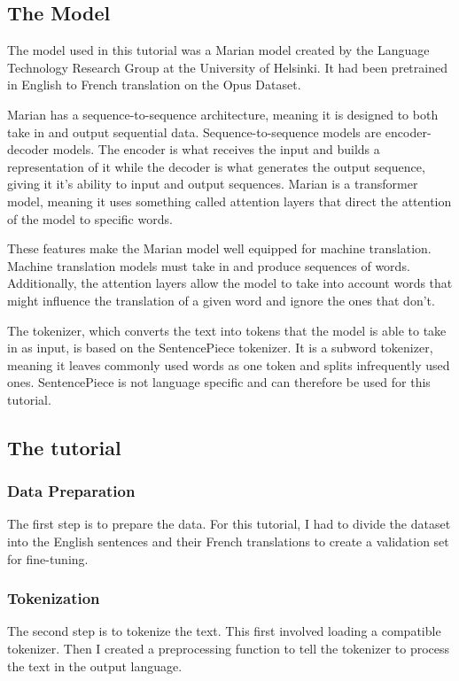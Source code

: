\documentclass[10pt,twocolumn]{article}
\begin{document}
\subsection{The Model}
The model used in this tutorial was a Marian model created by the Language Technology Research Group at the University of Helsinki. It had been pretrained in English to French translation on the Opus Dataset. 

Marian has a sequence-to-sequence architecture, meaning it is designed to both take in and output sequential data. Sequence-to-sequence models are encoder-decoder models. The encoder is what receives the input and builds a representation of it while the decoder is what generates the output sequence, giving it it's ability to input and output sequences. Marian is a transformer model, meaning it uses something called attention layers that direct the attention of the model to specific words. 

These features make the Marian model well equipped for machine translation. Machine translation models must take in and produce sequences of words. Additionally, the attention layers allow the model to take into account words that might influence the translation of a given word and ignore the ones that don't. 

The tokenizer, which converts the text into tokens that the model is able to take in as input, is based on the SentencePiece tokenizer. It is a subword tokenizer, meaning it leaves commonly used words as one token and splits infrequently used ones. SentencePiece is not language specific and can therefore be used for this tutorial.

\subsection{The tutorial}

\subsubsection{Data Preparation}
\hspace{\parindent}The first step is to prepare the data. For this tutorial, I had to divide the dataset into the English sentences and their French translations to create a validation set for fine-tuning. 

\subsubsection{Tokenization}
\hspace{\parindent}The second step is to tokenize the text. This first involved loading a compatible tokenizer. Then I created a preprocessing function to tell the tokenizer to process the text in the output language.
\end{document}
